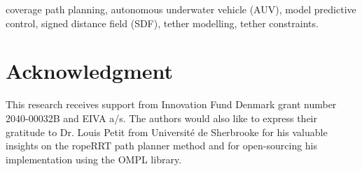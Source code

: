 \documentclass[letterpaper, 10 pt, conference]{ieeetran}  %
\begin{document}
\begin{IEEEkeywords}
coverage path planning, autonomous underwater vehicle (AUV), model predictive control, signed distance field (SDF), tether modelling, tether constraints.
\end{IEEEkeywords}

\IEEEpeerreviewmaketitle






 
 

%

\section*{Acknowledgment}
This research receives support from Innovation Fund Denmark grant number 2040-00032B and EIVA a/s. The authors would also like to express their gratitude to Dr. Louis Petit from Université de Sherbrooke for his valuable insights on the ropeRRT path planner method and for open-sourcing his implementation using the OMPL library.


%
\end{document}
